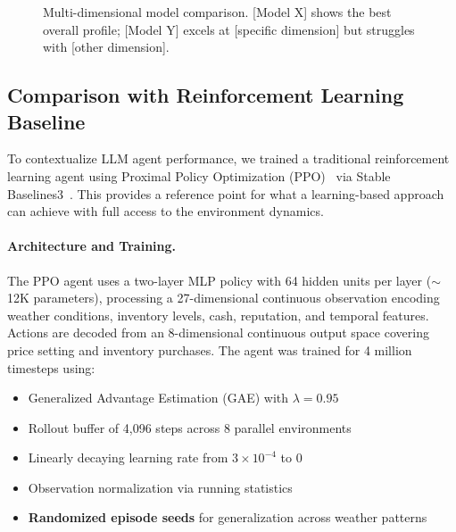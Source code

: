 \begin{figure}[h]
\centering
{}
\caption{Multi-dimensional model comparison. [Model X] shows the best overall profile; [Model Y] excels at [specific dimension] but struggles with [other dimension].}
\label{fig:model-radar}
\end{figure}

\subsection{Comparison with Reinforcement Learning Baseline}
\label{sec:rl-baseline}

To contextualize LLM agent performance, we trained a traditional reinforcement learning agent using Proximal Policy Optimization (PPO)~\citep{schulman2017proximal} via Stable Baselines3~\citep{stable-baselines3}. This provides a reference point for what a learning-based approach can achieve with full access to the environment dynamics.

\paragraph{Architecture and Training.}
The PPO agent uses a two-layer MLP policy with 64 hidden units per layer ($\sim$12K parameters), processing a 27-dimensional continuous observation encoding weather conditions, inventory levels, cash, reputation, and temporal features. Actions are decoded from an 8-dimensional continuous output space covering price setting and inventory purchases. The agent was trained for 4 million timesteps using:
\begin{itemize}[noitemsep]
    \item Generalized Advantage Estimation (GAE) with $\lambda = 0.95$
    \item Rollout buffer of 4,096 steps across 8 parallel environments
    \item Linearly decaying learning rate from $3 \times 10^{-4}$ to 0
    \item Observation normalization via running statistics
    \item \textbf{Randomized episode seeds} for generalization across weather patterns
\end{itemize}

